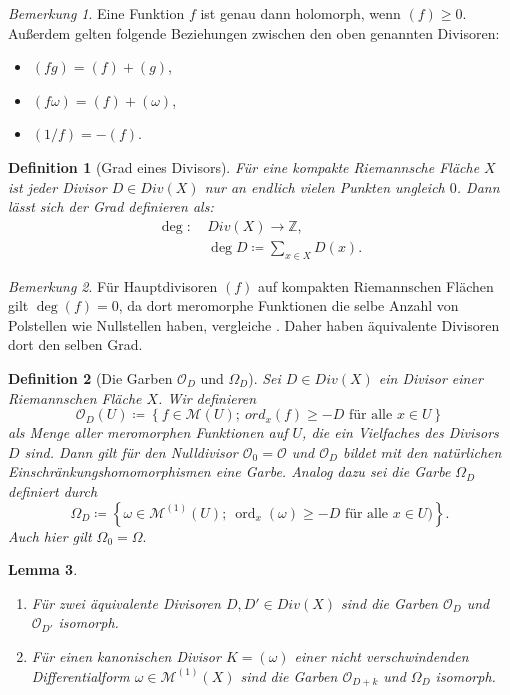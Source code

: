 \documentclass[11pt,a4paper,toc=bibliography]{scrartcl}
\theoremstyle{def}
\newtheorem{defi}{Definition}[section]
\theoremstyle{thm}
\newtheorem{lemma}[defi]{Lemma}
\theoremstyle{remark}
\newtheorem*{bem}{Bemerkung}
\DeclareMathOperator{\ord}{ord}
\begin{document}
\begin{bem}
	Eine Funktion $f$ ist genau dann holomorph, wenn $(f)\geq 0$. Außerdem gelten folgende Beziehungen zwischen den oben genannten Divisoren:
	\begin{itemize}
		\item $(fg)=(f)+(g)$,
		\item $(f\omega)=(f)+(\omega)$,
		\item $(1/f)=-(f) $.
	\end{itemize}
\end{bem}
\begin{defi}[Grad eines Divisors]
	Für eine kompakte Riemannsche Fläche $X$ ist jeder Divisor $D\in Div(X)$ nur an endlich vielen Punkten ungleich $0$. Dann lässt sich der Grad definieren als:
	\begin{align*}
		\deg:~&Div(X)\rightarrow \mathbb{Z},\\
			&\deg D\coloneqq \sum_{x\in X}D(x).
	\end{align*}
	\end{defi}
\begin{bem}
	Für Hauptdivisoren $(f)$ auf kompakten Riemannschen Flächen gilt $\deg(f)=0$, da dort meromorphe Funktionen die selbe Anzahl von Polstellen wie Nullstellen haben, vergleiche \cite[~S.28]{forster}. Daher haben äquivalente Divisoren dort den selben Grad.
\end{bem}
\begin{defi}[Die Garben $\mathcal{O}_D$ und $\Omega_D$]
	Sei $D\in Div(X)$ ein Divisor einer Riemannschen Fläche $X$. Wir definieren
	\[\mathcal{O}_D(U)\coloneqq \left\{ f\in\mathcal{M}(U);~\textstyle{ord_x (f)}\geq -D\text{ für alle }x\in U \right\}
	\]
	als Menge aller meromorphen Funktionen auf $U$, die ein Vielfaches des Divisors $D$ sind. Dann gilt für den Nulldivisor $\mathcal{O}_0=\mathcal{O}$ und $\mathcal{O}_D$ bildet mit den natürlichen Einschränkungshomomorphismen eine Garbe. Analog dazu sei die Garbe $\Omega_D$ definiert durch
	\[
	\Omega_D\coloneqq \left\{\omega \in \mathcal{M}^{(1)}(U); ~\textstyle{\ord_x (\omega)}\geq -D\text{ für alle } x\in U)\right\}.
	\]
	Auch hier gilt $\Omega_0=\Omega.$
\end{defi}
\begin{lemma}
	\begin{enumerate}
		\item Für zwei äquivalente Divisoren $D,D'\in Div(X)$ sind die Garben $\mathcal{O}_D$ und $\mathcal{O}_{D'}$ isomorph.
		\item 
		Für einen kanonischen Divisor $K=(\omega)$ einer nicht verschwindenden Differentialform $\omega\in \mathcal{M}^{(1)}(X)$ sind die Garben $\mathcal{O}_{D+k}$ und $\Omega_D$ isomorph.
	\end{enumerate}
\end{lemma}
\end{document}
